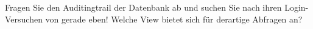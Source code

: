     \item Fragen Sie den Auditingtrail der Datenbank ab und suchen Sie nach ihren Login-Versuchen von gerade eben! Welche View bietet sich f\"ur derartige Abfragen an?
